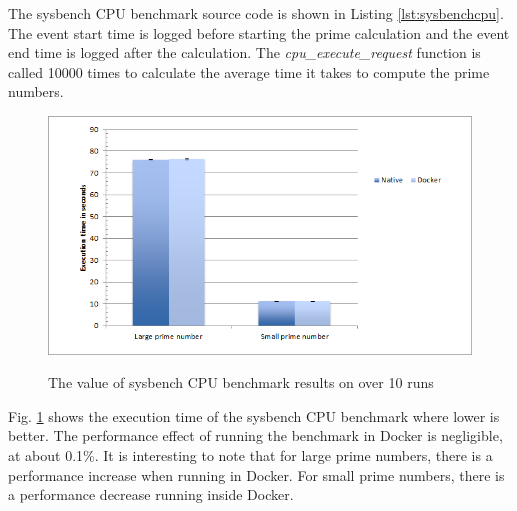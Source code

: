 \documentclass[11pt]{article}
\begin{document}
The sysbench CPU benchmark source code is shown in Listing \ref{lst:sysbenchcpu}. The event start time is logged before starting the prime calculation and the event end time is logged after the calculation. The \textit{cpu\_execute\_request} function is called 10000 times to calculate the average time it takes to compute the prime numbers. 


\begin{figure}
	\centering
	{\includegraphics[width=150mm]{cpu.png}}
	\caption{ The value of sysbench CPU benchmark results on over 10 runs}
	\label{fig:cpu}
\end{figure}

Fig. \ref{fig:cpu} shows the execution time of the sysbench CPU benchmark where lower is better. The performance effect of running the benchmark in Docker is negligible, at about 0.1\%. It is interesting to note that for large prime numbers, there is a performance increase when running in Docker. For small prime numbers, there is a performance decrease running inside Docker.
\end{document}
